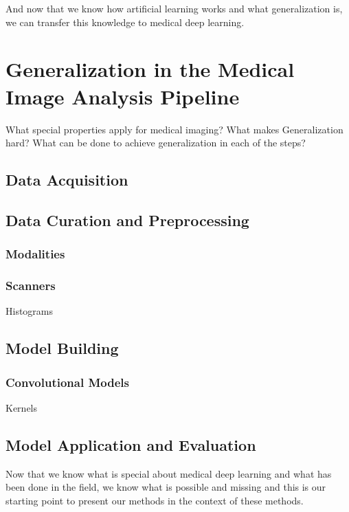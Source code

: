     And now that we know how artificial learning works and what generalization is, we can transfer this knowledge to medical deep learning.

\section{Generalization in the Medical Image Analysis Pipeline}
    What special properties apply for medical imaging?
    What makes Generalization hard?
    What can be done to achieve generalization in each of the steps?

    \subsection{Data Acquisition}
    \subsection{Data Curation and Preprocessing}
        \subsubsection{Modalities}
        \subsubsection{Scanners}
            Histograms
    \subsection{Model Building}
        \subsubsection{Convolutional Models}
            Kernels

    \subsection{Model Application and Evaluation}

    Now that we know what is special about medical deep learning and what has been done in the field, we know what is possible and missing and this is our starting point to present our methods in the context of these methods.